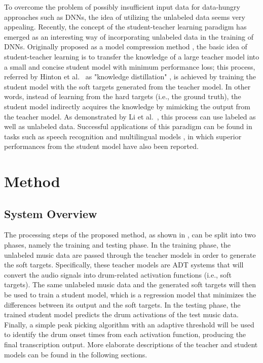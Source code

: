 \documentclass{article}
\begin{document}
To overcome the problem of possibly insufficient input data for data-hungry approaches such as DNNs, the idea of utilizing the unlabeled data seems very appealing. Recently, the concept of the student-teacher learning paradigm has emerged as an interesting way of incorporating unlabeled data in the training of DNNs. Originally proposed as a model compression method \cite{Bucilua2006}, the basic idea of student-teacher learning is to transfer the knowledge of a large teacher model into a small and concise student model with minimum performance loss; this process, referred by Hinton et al.~ as "knowledge distillation" \cite{Hinton2015}, is achieved by training the student model with the soft targets generated from the teacher model. In other words, instead of learning from the hard targets (i.e., the ground truth), the student model indirectly acquires the knowledge by mimicking the output from the teacher model. As demonstrated by Li et al.~\cite{Li2014}, this process can use labeled as well as unlabeled data. Successful applications of this paradigm can be found in tasks such as speech recognition \cite{Watanabe2017} and multilingual models \cite{Cui2017}, in which superior performances from the student model have also been reported.

\section{Method}\label{sec:method}
\subsection{System Overview}
The processing steps of the proposed method, as shown in , can be split into two phases, namely the training and testing phase. In the training phase, the unlabeled music data are passed through the teacher models in order to generate the soft targets. Specifically, these teacher models are ADT systems that will convert the audio signals into drum-related activation functions (i.e., soft targets). The same unlabeled music data and the generated soft targets will then be used to train a student model, which is a regression model that minimizes the differences between its output and the soft targets. In the testing phase, the trained student model predicts the drum activations of the test music data. Finally, a simple peak picking algorithm with an adaptive threshold will be used to identify the drum onset times from each activation function, producing the final transcription output. More elaborate descriptions of the teacher and student models can be found in the following sections.  
\end{document}
